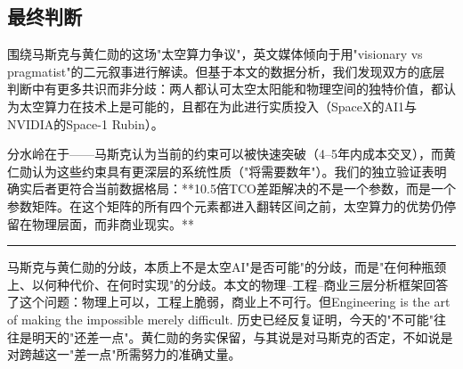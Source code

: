 \subsection{最终判断}

围绕马斯克与黄仁勋的这场"太空算力争议"，英文媒体倾向于用"visionary vs pragmatist"的二元叙事进行解读。但基于本文的数据分析，我们发现双方的底层判断中有更多共识而非分歧：两人都认可太空太阳能和物理空间的独特价值，都认为太空算力在技术上是可能的，且都在为此进行实质投入（SpaceX的AI1与NVIDIA的Space-1 Rubin\cite{nvidia2026space}）。

分水岭在于——马斯克认为当前的约束可以被快速突破（4--5年内成本交叉），而黄仁勋认为这些约束具有更深层的系统性质（"将需要数年"）。我们的独立验证表明确实后者更符合当前数据格局：**10.5倍TCO差距解决的不是一个参数，而是一个参数矩阵。在这个矩阵的所有四个元素都进入翻转区间之前，太空算力的优势仍停留在物理层面，而非商业现实。**

\begin{center}
\rule{0.3\textwidth}{0.4pt}
\end{center}

\noindent 马斯克与黄仁勋的分歧，本质上不是太空AI"是否可能"的分歧，而是"在何种瓶颈上、以何种代价、在何时实现"的分歧。本文的物理--工程--商业三层分析框架回答了这个问题：物理上可以，工程上脆弱，商业上不可行。但Engineering is the art of making the impossible merely difficult. 历史已经反复证明，今天的"不可能"往往是明天的"还差一点"。黄仁勋的务实保留，与其说是对马斯克的否定，不如说是对跨越这一"差一点"所需努力的准确丈量。

